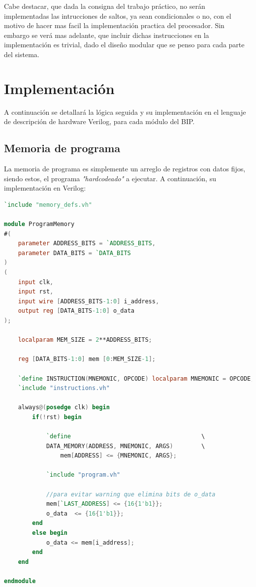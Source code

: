 \documentclass{article}
\begin{document}
Cabe destacar, que dada la consigna del trabajo práctico, no serán implementadas las intrucciones de saltos,
ya sean condicionales o no, con el motivo de hacer mas facil la implementación practica del procesador.
Sin embargo se verá mas adelante, que incluir dichas instrucciones en la implementación es trivial, dado
el diseño modular que se penso para cada parte del sistema.

\newpage
\section{Implementación}

A continuación se detallará la lógica seguida y su implementación en el lenguaje de descripción de hardware Verilog,
para cada módulo del BIP.

\subsection{Memoria de programa}

La memoria de programa es simplemente un arreglo de registros con datos fijos, siendo estos, el programa
\textit{"hardcodeado"} a ejecutar. A continuación, su implementación en Verilog:

\begin{shaded}
\begin{lstlisting}[language=Verilog]
`include "memory_defs.vh"

module ProgramMemory
#(
    parameter ADDRESS_BITS = `ADDRESS_BITS,
    parameter DATA_BITS = `DATA_BITS
)
(
    input clk,
    input rst,
    input wire [ADDRESS_BITS-1:0] i_address,
    output reg [DATA_BITS-1:0] o_data
);

    localparam MEM_SIZE = 2**ADDRESS_BITS;

    reg [DATA_BITS-1:0] mem [0:MEM_SIZE-1];

    `define INSTRUCTION(MNEMONIC, OPCODE) localparam MNEMONIC = OPCODE;
    `include "instructions.vh"

    always@(posedge clk) begin
        if(!rst) begin

            `define                                     \
            DATA_MEMORY(ADDRESS, MNEMONIC, ARGS)        \
                mem[ADDRESS] <= {MNEMONIC, ARGS};

            `include "program.vh"

            //para evitar warning que elimina bits de o_data
            mem[`LAST_ADDRESS] <= {16{1'b1}};
            o_data  <= {16{1'b1}};
        end
        else begin
            o_data <= mem[i_address];
        end
    end

endmodule
\end{lstlisting}
\end{shaded}
\end{document}
